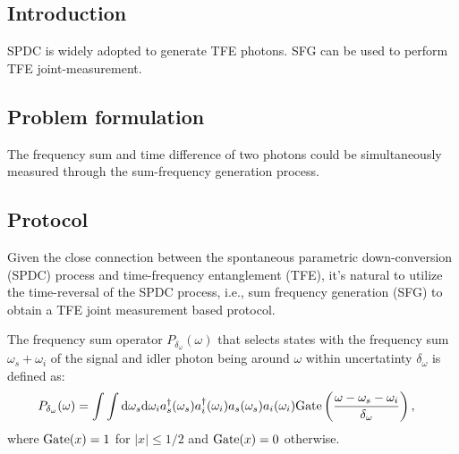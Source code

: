 \documentclass[../../note.tex]{subfiles}
\begin{document}
\begin{proposition}
    
\end{proposition}

\begin{definition}
    
\end{definition}

\begin{definition}
    
\end{definition}


\subsection{Introduction}
SPDC is widely adopted to generate TFE photons. SFG can be used to perform TFE joint-measurement.


\subsection{Problem formulation}
The frequency sum and time difference of two photons could be simultaneously measured through the sum-frequency generation process.

\subsection{Protocol}
Given the close connection between the spontaneous parametric down-conversion (SPDC) process and time-frequency entanglement (TFE), it's natural to utilize the time-reversal of the SPDC process, i.e., sum frequency generation (SFG) to obtain a TFE joint measurement based protocol.

\begin{definition}
    The frequency sum operator  $P_{\delta_{\omega}}(\omega)$ that selects states with the frequency sum $\omega_s + \omega_i$ of the signal and idler photon being around $\omega$ within uncertatinty $\delta_{\omega}$  is defined as:
    \begin{align}
        P_{\delta_{\omega}}(\omega)
        &= \int \int {\rm d}\omega_s{\rm d}\omega_i a_s^\dagger(\omega_s) a_i^\dagger(\omega_i) a_s(\omega_s) a_i(\omega_i) {\rm Gate}\left(\frac{\omega -\omega_s-\omega_i}{\delta_{\omega}}\right),
    \end{align}
    where ${\rm Gate}(x) = 1$ for $\vert x \vert \leq 1/2$ and ${\rm Gate}(x) = 0$ otherwise.
\end{definition}
\end{document}
